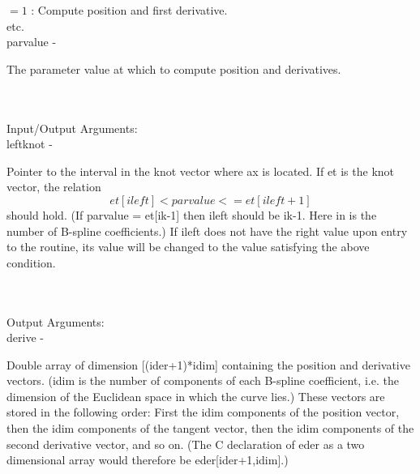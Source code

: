 		    \>\>\>\>\>       $= 1$ : Compute position and first derivative.\\
		    \>\>\>\>\>       etc.\\
        \>\>    {\fov parvalue}\> - \>  \begin{minipg2}
                     The parameter value at which to compute
                       position and derivatives.
                               \end{minipg2}\\
\\
	\>Input/Output Arguments:\\
        \>\>    {\fov leftknot}\> - \>  \begin{minipg2}
                     Pointer to the interval in the knot vector
                        where ax is located. If et is the knot vector,
                        the relation
                          $$et[ileft] < parvalue <= et[ileft+1]$$
                        should hold. (If parvalue = et[ik-1] then ileft
                        should be ik-1. Here in is the number of B-spline
                        coefficients.)
                        If ileft does not have the right value upon
                        entry to the routine, its value will be changed
                        to the value satisfying the above condition.
                               \end{minipg2}\\
\\
	\>Output Arguments:\\
        \>\>    {\fov derive}\> - \>  \begin{minipg2}
                     Double array of dimension [(ider+1)*idim]
                       containing the position and derivative vectors.
                       (idim is the number of components of each B-spline
                       coefficient, i.e. the dimension of the Euclidean
                       space in which the curve lies.)
                       These vectors are stored in the following order:
                       First the idim components of the position vector,
                       then the idim components of the tangent vector,
                       then the idim components of the second derivative
                       vector, and so on.
                       (The C declaration of eder as a two dimensional array
                       would therefore be eder[ider+1,idim].)
                               \end{minipg2}\\

